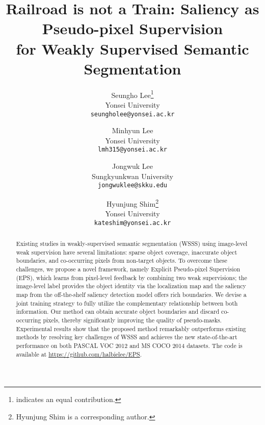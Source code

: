 \documentclass[final]{cvpr}
\begin{document}
\title{Railroad is not a Train: Saliency as Pseudo-pixel Supervision \\ for Weakly Supervised Semantic Segmentation}

\author{Seungho Lee\thanks{ indicates an equal contribution.}\\
Yonsei University\\
{\tt\small seungholee@yonsei.ac.kr}
\and
Minhyun Lee\footnotemark[1]\\
Yonsei University\\
{\tt\small lmh315@yonsei.ac.kr}
\and 
Jongwuk Lee\\
Sungkyunkwan University\\
{\tt\small jongwuklee@skku.edu}
\and 
Hyunjung Shim\thanks{Hyunjung Shim is a corresponding author.}\\
Yonsei University\\
{\tt\small kateshim@yonsei.ac.kr}
}

\maketitle
\thispagestyle{empty}
\pagestyle{empty}


\begin{abstract}
Existing studies in weakly-supervised semantic segmentation (WSSS) using image-level weak supervision have several limitations: sparse object coverage, inaccurate object boundaries, and co-occurring pixels from non-target objects. To overcome these challenges, we propose a novel framework, namely Explicit Pseudo-pixel Supervision (EPS), which learns from pixel-level feedback by combining two weak supervisions; the image-level label provides the object identity via the localization map and the saliency map from the off-the-shelf saliency detection model offers rich boundaries. We devise a joint training strategy to fully utilize the complementary relationship between both information. Our method can obtain accurate object boundaries and discard co-occurring pixels, thereby significantly improving the quality of pseudo-masks. Experimental results show that the proposed method remarkably outperforms existing methods by resolving key challenges of WSSS and achieves the new state-of-the-art performance on both PASCAL VOC 2012 and MS COCO 2014 datasets. The code is available at \href{https://github.com/halbielee/EPS}{https://github.com/halbielee/EPS}.
\end{abstract}
\end{document}
